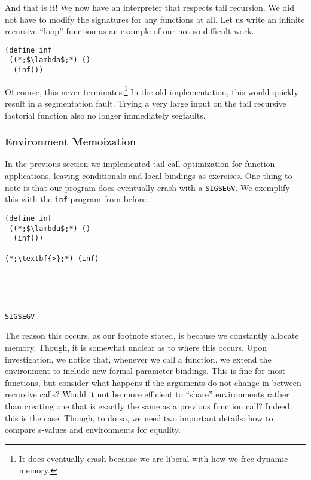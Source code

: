 And that is it! We now have an interpreter that respects tail recursion. We did not have to modify the signatures for any functions at all. Let us write an infinite recursive ``loop'' function as an example of our not-so-difficult work.

\begin{cl}[]{}\begin{lstlisting}[language=MyScheme]
(define inf
 ((*;$\lambda$;*) ()
  (inf)))
\end{lstlisting}\end{cl}

Of course, this never terminates.\footnote{It does eventually crash because we are liberal with how we free dynamic memory.} In the old implementation, this would quickly result in a segmentation fault. Trying a very large input on the tail recursive factorial function also no longer immediately segfaults.



\subsubsection*{Environment Memoization}

In the previous section we implemented tail-call optimization for function applications, leaving conditionals and local bindings as exercises. One thing to note is that our program does eventually crash with a \texttt{SIGSEGV}. We exemplify this with the \texttt{inf} program from before.

\begin{cloast}[]{}\begin{lstlisting}[language=MyScheme]
(define inf
 ((*;$\lambda$;*) ()
  (inf)))

(*;\textbf{>};*) (inf)
\end{lstlisting}
\tcblower
\begin{lstlisting}[language=MyOutput]




SIGSEGV
\end{lstlisting}
\end{cloast}

The reason this occurs, as our footnote stated, is because we constantly allocate memory. Though, it is somewhat unclear as to where this occurs. Upon investigation, we notice that, whenever we call a function, we extend the environment to include new formal parameter bindings. This is fine for most functions, but consider what happens if the arguments do not change in between recursive calls? Would it not be more efficient to ``share'' environments rather than creating one that is exactly the same as a previous function call? Indeed, this is the case. Though, to do so, we need two important details: how to compare s-values and environments for equality. 

